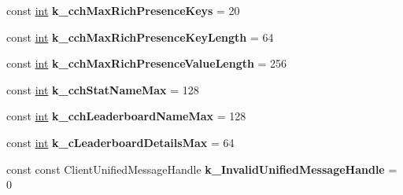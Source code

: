 \begin{DoxyCompactItemize}
\item 
\hypertarget{classValve_1_1Steamworks_1_1SteamAPI_a169ed479ec1926b75c801212b5be6583}{}const \hyperlink{SDL__thread_8h_a6a64f9be4433e4de6e2f2f548cf3c08e}{int} {\bfseries k\+\_\+cch\+Max\+Rich\+Presence\+Keys} = 20\label{classValve_1_1Steamworks_1_1SteamAPI_a169ed479ec1926b75c801212b5be6583}

\item 
\hypertarget{classValve_1_1Steamworks_1_1SteamAPI_a31bd97a23c17ba5bc2bb274abe9a5d17}{}const \hyperlink{SDL__thread_8h_a6a64f9be4433e4de6e2f2f548cf3c08e}{int} {\bfseries k\+\_\+cch\+Max\+Rich\+Presence\+Key\+Length} = 64\label{classValve_1_1Steamworks_1_1SteamAPI_a31bd97a23c17ba5bc2bb274abe9a5d17}

\item 
\hypertarget{classValve_1_1Steamworks_1_1SteamAPI_a2e5895c2f94c5acd42bb4fc26e71ed27}{}const \hyperlink{SDL__thread_8h_a6a64f9be4433e4de6e2f2f548cf3c08e}{int} {\bfseries k\+\_\+cch\+Max\+Rich\+Presence\+Value\+Length} = 256\label{classValve_1_1Steamworks_1_1SteamAPI_a2e5895c2f94c5acd42bb4fc26e71ed27}

\item 
\hypertarget{classValve_1_1Steamworks_1_1SteamAPI_aa30863f7c8e911a27d7a7600c33c2eb3}{}const \hyperlink{SDL__thread_8h_a6a64f9be4433e4de6e2f2f548cf3c08e}{int} {\bfseries k\+\_\+cch\+Stat\+Name\+Max} = 128\label{classValve_1_1Steamworks_1_1SteamAPI_aa30863f7c8e911a27d7a7600c33c2eb3}

\item 
\hypertarget{classValve_1_1Steamworks_1_1SteamAPI_a67644139d5785d3b0d81d3b59ea4c852}{}const \hyperlink{SDL__thread_8h_a6a64f9be4433e4de6e2f2f548cf3c08e}{int} {\bfseries k\+\_\+cch\+Leaderboard\+Name\+Max} = 128\label{classValve_1_1Steamworks_1_1SteamAPI_a67644139d5785d3b0d81d3b59ea4c852}

\item 
\hypertarget{classValve_1_1Steamworks_1_1SteamAPI_ae1f4d20251ef51a5277e7bd2ec0cfec5}{}const \hyperlink{SDL__thread_8h_a6a64f9be4433e4de6e2f2f548cf3c08e}{int} {\bfseries k\+\_\+c\+Leaderboard\+Details\+Max} = 64\label{classValve_1_1Steamworks_1_1SteamAPI_ae1f4d20251ef51a5277e7bd2ec0cfec5}

\item 
\hypertarget{classValve_1_1Steamworks_1_1SteamAPI_a2c936eeb05482becf0f989d8a582edbb}{}const const Client\+Unified\+Message\+Handle {\bfseries k\+\_\+\+Invalid\+Unified\+Message\+Handle} = 0\label{classValve_1_1Steamworks_1_1SteamAPI_a2c936eeb05482becf0f989d8a582edbb}


\end{DoxyCompactItemize}
